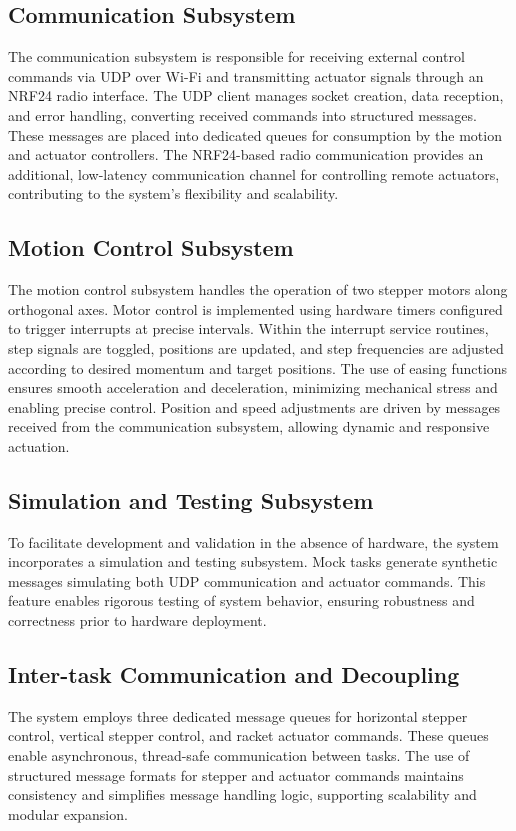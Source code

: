 \subsection{Communication Subsystem}
The communication subsystem is responsible for receiving external control commands via UDP over Wi-Fi and transmitting actuator signals through an NRF24 radio interface. The UDP client manages socket creation, data reception, and error handling, converting received commands into structured messages. These messages are placed into dedicated queues for consumption by the motion and actuator controllers. The NRF24-based radio communication provides an additional, low-latency communication channel for controlling remote actuators, contributing to the system's flexibility and scalability.

\subsection{Motion Control Subsystem}
The motion control subsystem handles the operation of two stepper motors along orthogonal axes. Motor control is implemented using hardware timers configured to trigger interrupts at precise intervals. Within the interrupt service routines, step signals are toggled, positions are updated, and step frequencies are adjusted according to desired momentum and target positions. The use of easing functions ensures smooth acceleration and deceleration, minimizing mechanical stress and enabling precise control. Position and speed adjustments are driven by messages received from the communication subsystem, allowing dynamic and responsive actuation.

\subsection{Simulation and Testing Subsystem}
To facilitate development and validation in the absence of hardware, the system incorporates a simulation and testing subsystem. Mock tasks generate synthetic messages simulating both UDP communication and actuator commands. This feature enables rigorous testing of system behavior, ensuring robustness and correctness prior to hardware deployment.

\subsection{Inter-task Communication and Decoupling}
The system employs three dedicated message queues for horizontal stepper control, vertical stepper control, and racket actuator commands. These queues enable asynchronous, thread-safe communication between tasks. The use of structured message formats for stepper and actuator commands maintains consistency and simplifies message handling logic, supporting scalability and modular expansion.

